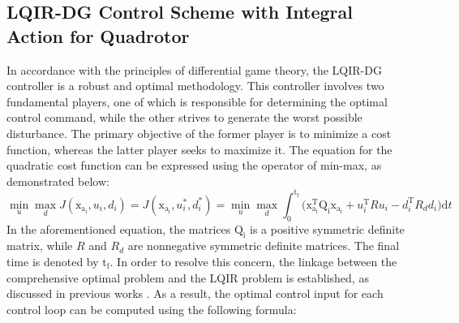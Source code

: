 \documentclass[3p,times]{elsarticle}
\begin{document}
\subsection{LQIR-DG Control Scheme with Integral Action for Quadrotor}
\noindent In accordance with the principles of differential game theory, the LQIR-DG controller is a robust and optimal methodology. This controller involves two fundamental players, one of which is responsible for determining the optimal control command, while the other strives to generate the worst possible disturbance. The primary objective of the former player is to minimize a cost function, whereas the latter player seeks to maximize it. The equation for the quadratic cost function can be expressed using the operator of min-max, as demonstrated below:
\begin{equation}
    \min_{u} \max_{d} J(\boldsymbol{\mathrm{x_{a_i}}}, {u_i}, {d_i}) = J(\boldsymbol{\mathrm{x_{a_i}}}, {u^*_i}, {d^*_i})=\min_{u} \max_{d}
     \int_{0}^{\mathrm{t_f}}\biggl (\boldsymbol{\mathrm{x^\mathrm{T}_{a_i}}}  \boldsymbol{\mathrm{Q_i}} \boldsymbol{\mathrm{x_{a_i}}}+
    {{u^\mathrm{T}_i}}  {{R}} {{u_i}}-
    {{d^\mathrm{T}_{i}}} {{ R_{d} d_{i}}}
    \biggl )\mathrm{d}t
\end{equation}
In the aforementioned equation, the matrices $\boldsymbol{\mathrm{Q_i}}$ is a positive symmetric definite matrix, while ${{ R}}$ and ${{R_{d}}}$ are nonnegative symmetric definite matrices. The final time is denoted by $\mathrm{t_f}$. In order to resolve this concern, the linkage between the comprehensive optimal problem and the LQIR problem is established, as discussed in previous works \cite{LQDG}. As a result, the optimal control input for each control loop can be computed using the following formula:
\end{document}
